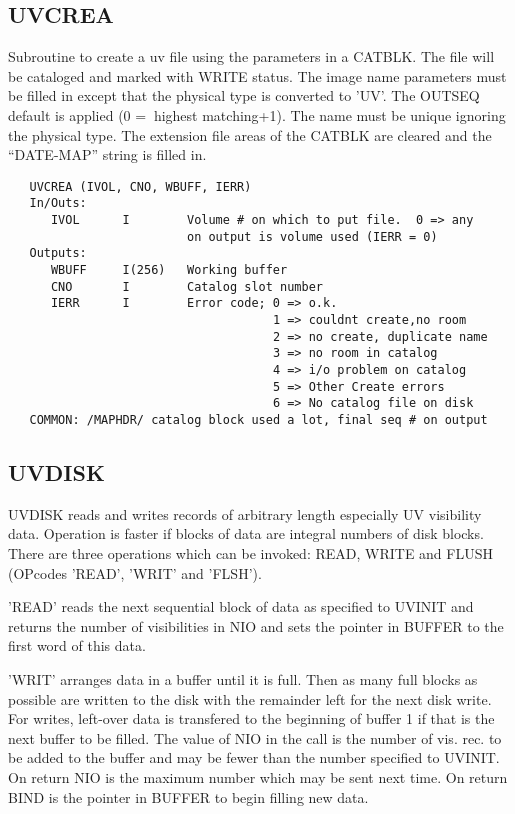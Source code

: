 \subsection{UVCREA}
Subroutine to create a uv file using the parameters in a CATBLK.
The file will be cataloged and marked with WRITE status.  The image
name parameters must be filled in except that the physical type is
converted to 'UV'.  The OUTSEQ default is applied (0 =$\>$ highest
matching+1).  The name must be unique ignoring the physical type.
The extension file areas of the CATBLK are cleared and the
``DATE-MAP'' string is filled in.
\begin{verbatim}
   UVCREA (IVOL, CNO, WBUFF, IERR)
   In/Outs:
      IVOL      I        Volume # on which to put file.  0 => any
                         on output is volume used (IERR = 0)
   Outputs:
      WBUFF     I(256)   Working buffer
      CNO       I        Catalog slot number
      IERR      I        Error code; 0 => o.k.
                                     1 => couldnt create,no room
                                     2 => no create, duplicate name
                                     3 => no room in catalog
                                     4 => i/o problem on catalog
                                     5 => Other Create errors
                                     6 => No catalog file on disk
   COMMON: /MAPHDR/ catalog block used a lot, final seq # on output
\end{verbatim}

\subsection{UVDISK}
UVDISK reads and writes records of arbitrary length especially UV
visibility data.  Operation is faster if blocks of data are integral
numbers of disk blocks.  There are three operations which can be
invoked: READ, WRITE and FLUSH (OPcodes 'READ', 'WRIT' and 'FLSH').

'READ' reads the next sequential block of data as specified to
UVINIT and returns the number of visibilities in NIO and sets the
pointer in BUFFER to the first word of this data.

'WRIT' arranges data in a buffer until it is full.  Then as many full
blocks as possible are written to the disk with the remainder left for
the next disk write.  For writes, left-over data is transfered to the
beginning of buffer 1 if that is the next buffer to be filled.  The
value of NIO in the call is the number of vis. rec. to be added to the
buffer and may be fewer than the number specified to UVINIT.  On
return NIO is the maximum number which may be sent next time.  On
return BIND is the pointer in BUFFER to begin filling new data.


